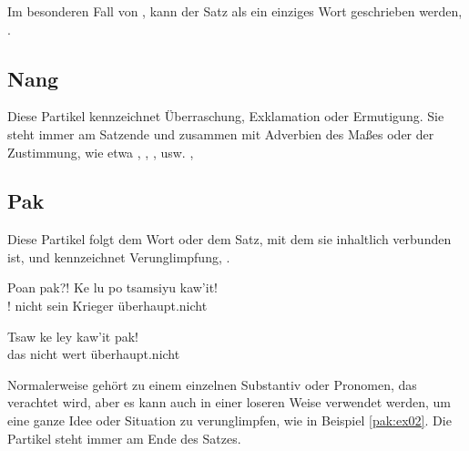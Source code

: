 \subsubsection{} Im besonderen Fall von  , kann der Satz als ein einziges Wort geschrieben werden, .

\subsection{Nang} Diese Partikel kennzeichnet Überraschung, Exklamation oder Ermutigung. Sie steht immer am Satzende und zusammen mit Adverbien des Maßes oder der Zustimmung, wie etwa , , , usw.  ,  

\subsection{Pak} 
Diese Partikel folgt dem Wort oder dem Satz, mit dem sie inhaltlich verbunden ist, und kennzeichnet Verunglimpfung,  .

\begin{interlin}
	\gll Poan pak?! Ke lu po tsamsiyu kaw'it! \\
	 ! nicht sein  Krieger überhaupt.nicht \\
\end{interlin}

\begin{interlin} \label{pak:ex02}
	\gll Tsaw ke ley kaw'it pak! \\
	das nicht wert überhaupt.nicht  \\
	 \Ipawl{}
\end{interlin}

\noindent Normalerweise gehört  zu einem einzelnen Substantiv oder Pronomen, das verachtet wird, aber es kann auch in einer loseren Weise verwendet werden, um eine ganze Idee oder Situation zu verunglimpfen, wie in Beispiel \ref{pak:ex02}. Die Partikel steht immer am Ende des Satzes.

